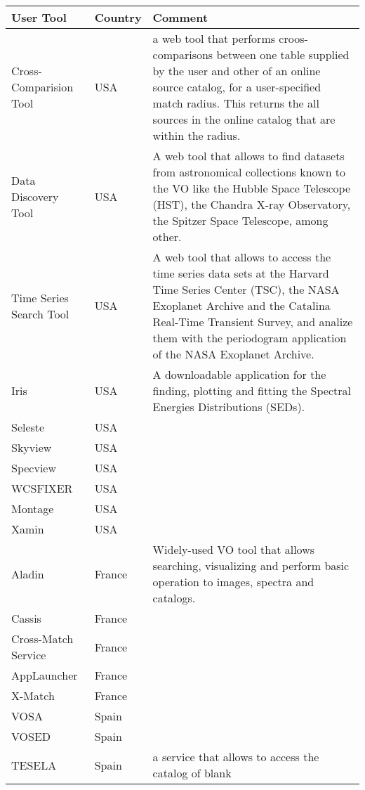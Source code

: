 \begin{table*}[h]
	\centering
	\begin{tabular}{|l|l|p{8.5cm}|}
	\hline
	\textbf{User Tool} & \textbf{Country} &  \textbf{Comment}\\
	\hline
  Cross-Comparision Tool & USA & a web tool that performs croos-comparisons between one table supplied by the user and other of an online source 
								catalog, for a user-specified match radius. This returns the all sources in the online catalog that are within the radius.\\
	\hline								 
  Data Discovery Tool & USA &  A web tool that allows to find datasets from astronomical collections known to the VO like the Hubble Space Telescope 
									(HST), the Chandra X-ray Observatory, the Spitzer Space Telescope, among other.\\
	\hline								 
  Time Series Search Tool & USA & A web tool that allows to access the time series data sets at the Harvard Time Series Center (TSC), the NASA 
									Exoplanet Archive and the Catalina Real-Time Transient Survey, and analize them with the periodogram application 
									of the NASA Exoplanet Archive.\\
  \hline
  Iris & USA & A downloadable application for the finding, plotting and fitting the 
			Spectral Energies Distributions (SEDs). \\
	\hline								 
  Seleste & USA & \\
	\hline								 
  Skyview & USA & \\
	\hline								 
  Specview & USA & \\
  \hline
  WCSFIXER & USA & \\
  \hline 
  Montage & USA & \\
  \hline
  Xamin & USA & \\
	\hline								 
  Aladin & France & Widely-used VO tool that allows searching, visualizing
and perform basic operation to images, spectra and catalogs.\\
	\hline								 
  Cassis & France & \\
	\hline								 
  Cross-Match Service & France  & \\
	\hline								 
  AppLauncher & France & \\
	\hline								 
  X-Match & France & \\
	\hline								 
   VOSA & Spain & \\
	\hline								 
  VOSED & Spain & \\
	\hline								 
  TESELA & Spain &  a service that allows to access the catalog of blank

\end{tabular}
\end{table*}
